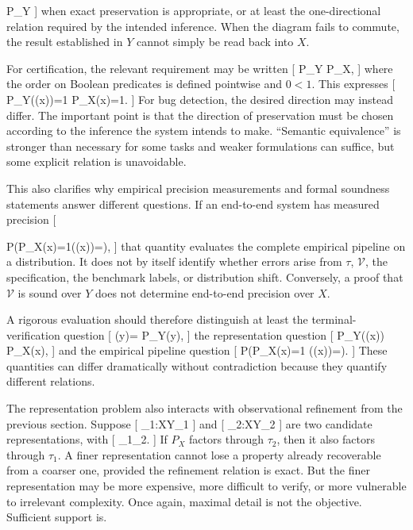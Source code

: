 \documentclass[11pt]{article}
\begin{document}
P_Y\circ\tau
]
when exact preservation is appropriate, or at least the one-directional relation required by the intended inference. When the diagram fails to commute, the result established in $Y$ cannot simply be read back into $X$.

For certification, the relevant requirement may be written
[
P_Y\circ\tau
\preceq
P_X,
]
where the order on Boolean predicates is defined pointwise and $0<1$. This expresses
[
P_Y(\tau(x))=1
\Longrightarrow
P_X(x)=1.
]
For bug detection, the desired direction may instead differ. The important point is that the direction of preservation must be chosen according to the inference the system intends to make. ``Semantic equivalence'' is stronger than necessary for some tasks and weaker formulations can suffice, but some explicit relation is unavoidable.

This also clarifies why empirical precision measurements and formal soundness statements answer different questions. If an end-to-end system has measured precision
[

P(P_X(x)=1\mid {}(\tau(x))=),
]
that quantity evaluates the complete empirical pipeline on a distribution. It does not by itself identify whether errors arise from $\tau$, $\mathcal{V}$, the specification, the benchmark labels, or distribution shift. Conversely, a proof that $\mathcal{V}$ is sound over $Y$ does not determine end-to-end precision over $X$.

A rigorous evaluation should therefore distinguish at least the terminal-verification question
[
(y)=
\Rightarrow
P_Y(y),
]
the representation question
[
P_Y(\tau(x))
\Rightarrow
P_X(x),
]
and the empirical pipeline question
[
P(P_X(x)=1\mid
{}(\tau(x))=).
]
These quantities can differ dramatically without contradiction because they quantify different relations.

The representation problem also interacts with observational refinement from the previous section. Suppose
[
\tau_1:X\rightarrow Y_1
]
and
[
\tau_2:X\rightarrow Y_2
]
are two candidate representations, with
[
\tau_1\succeq\tau_2.
]
If $P_X$ factors through $\tau_2$, then it also factors through $\tau_1$. A finer representation cannot lose a property already recoverable from a coarser one, provided the refinement relation is exact. But the finer representation may be more expensive, more difficult to verify, or more vulnerable to irrelevant complexity. Once again, maximal detail is not the objective. Sufficient support is.
\end{document}
